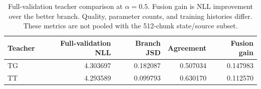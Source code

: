 \begin{table}[!t]
\centering
\begin{tabular}{lrrrr}
\toprule
Teacher & Full-validation NLL & Branch JSD & Agreement & Fusion gain\\
\midrule
TG & 4.303697 & 0.182087 & 0.507034 & 0.147983\\
TT & 4.293589 & 0.099793 & 0.630170 & 0.112570\\
\bottomrule
\end{tabular}
\caption{Full-validation teacher comparison at $\alpha=0.5$. Fusion gain is NLL improvement over the better branch. Quality, parameter counts, and training histories differ. These metrics are not pooled with the 512-chunk state/source subset.}
\label{tab:branch_comparison}
\end{table}
